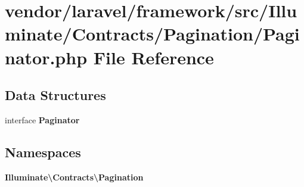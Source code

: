 \section{vendor/laravel/framework/src/\+Illuminate/\+Contracts/\+Pagination/\+Paginator.php File Reference}
\label{_contracts_2_pagination_2_paginator_8php}
\subsection*{Data Structures}
\begin{DoxyCompactItemize}
\item 
interface {\bf Paginator}
\end{DoxyCompactItemize}
\subsection*{Namespaces}
\begin{DoxyCompactItemize}
\item 
 {\bf Illuminate\textbackslash{}\+Contracts\textbackslash{}\+Pagination}
\end{DoxyCompactItemize}
